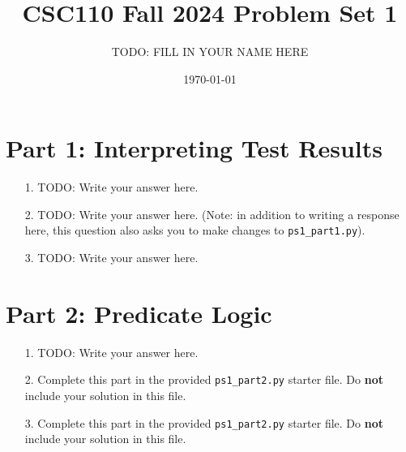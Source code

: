 \documentclass[12pt]{article}
\title{CSC110 Fall 2024 Problem Set 1}
\author{TODO: FILL IN YOUR NAME HERE}
\date{\today}
\begin{document}
\maketitle

\section*{Part 1: Interpreting Test Results}


\begin{enumerate}
\item[1.]
TODO: Write your answer here.

\item[2.]
TODO: Write your answer here. (Note: in addition to writing a response here, this question also asks you to make changes to \texttt{ps1\_part1.py}).

\item[3.]
TODO: Write your answer here.
\end{enumerate}


\section*{Part 2: Predicate Logic}

\begin{enumerate}

\item[1.]
TODO: Write your answer here.

\item[2.]
Complete this part in the provided \texttt{ps1\_part2.py} starter file.
Do \textbf{not} include your solution in this file.

\item[3.]
Complete this part in the provided \texttt{ps1\_part2.py} starter file.
Do \textbf{not} include your solution in this file.

\end{enumerate}
\end{document}
